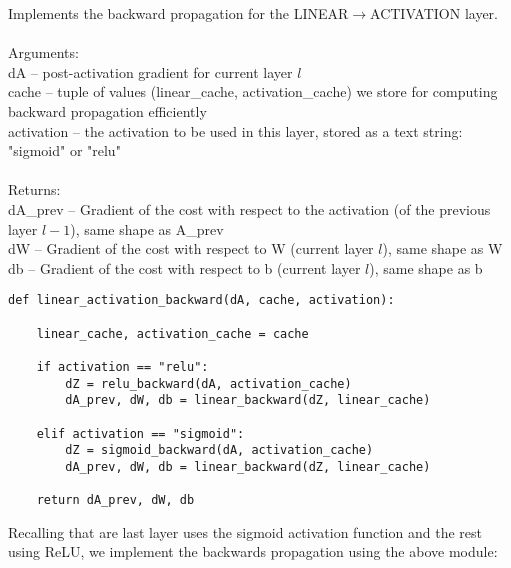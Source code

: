\documentclass[a4paper]{article}
\begin{document}
\begin{enumerate}
\begin{alg}{}{} Implements the backward propagation for the LINEAR$\to$ACTIVATION layer.\\~\\
Arguments: \\
dA -- post-activation gradient for current layer $l$ \\
cache -- tuple of values (linear\_cache, activation\_cache) we store for computing backward propagation efficiently\\
activation -- the activation to be used in this layer, stored as a text string: "sigmoid" or "relu"\\~\\
Returns: \\
dA\_prev -- Gradient of the cost with respect to the activation (of the previous layer $l-1$), same shape as A\_prev\\
dW -- Gradient of the cost with respect to W (current layer $l$), same shape as W\\
db -- Gradient of the cost with respect to b (current layer $l$), same shape as b\\
\begin{verbatim}
def linear_activation_backward(dA, cache, activation):

    linear_cache, activation_cache = cache
    
    if activation == "relu":
        dZ = relu_backward(dA, activation_cache)
        dA_prev, dW, db = linear_backward(dZ, linear_cache)
        
    elif activation == "sigmoid":
        dZ = sigmoid_backward(dA, activation_cache)
        dA_prev, dW, db = linear_backward(dZ, linear_cache)
    
    return dA_prev, dW, db
\end{verbatim}
\end{alg}

Recalling that are last layer uses the sigmoid activation function and the rest using ReLU, we implement the backwards propagation using the above module: 


\end{enumerate}
\end{document}
